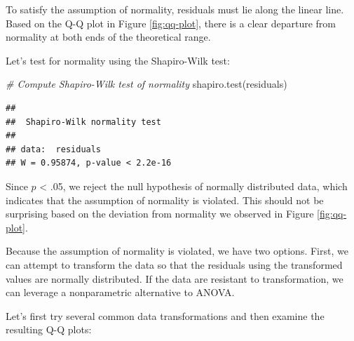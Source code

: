 \documentclass[
]{book}
\newenvironment{Shaded}{\begin{snugshade}}{\end{snugshade}}
\newcommand{\CommentTok}[1]{\textcolor[rgb]{0.56,0.35,0.01}{\textit{#1}}}
\newcommand{\FunctionTok}[1]{\textcolor[rgb]{0.00,0.00,0.00}{#1}}
\newcommand{\NormalTok}[1]{#1}
\begin{document}
To satisfy the assumption of normality, residuals must lie along the linear line. Based on the Q-Q plot in Figure \ref{fig:qq-plot}, there is a clear departure from normality at both ends of the theoretical range.

Let's test for normality using the Shapiro-Wilk test:

\begin{Shaded}
\begin{Highlighting}[]
\CommentTok{\# Compute Shapiro{-}Wilk test of normality}
\FunctionTok{shapiro.test}\NormalTok{(residuals)}
\end{Highlighting}
\end{Shaded}

\begin{verbatim}
## 
##  Shapiro-Wilk normality test
## 
## data:  residuals
## W = 0.95874, p-value < 2.2e-16
\end{verbatim}

Since \(p\) \textless{} .05, we reject the null hypothesis of normally distributed data, which indicates that the assumption of normality is violated. This should not be surprising based on the deviation from normality we observed in Figure \ref{fig:qq-plot}.

Because the assumption of normality is violated, we have two options. First, we can attempt to transform the data so that the residuals using the transformed values are normally distributed. If the data are resistant to transformation, we can leverage a nonparametric alternative to ANOVA.

Let's first try several common data transformations and then examine the resulting Q-Q plots:
\end{document}

